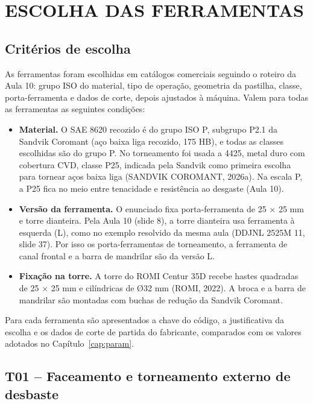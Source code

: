\chapter{ESCOLHA DAS FERRAMENTAS}

\section{Critérios de escolha}

As ferramentas foram escolhidas em catálogos comerciais seguindo o roteiro da Aula 10: grupo ISO do material, tipo de operação, geometria da pastilha, classe, porta-ferramenta e dados de corte, depois ajustados à máquina. Valem para todas as ferramentas as seguintes condições:

\begin{itemize}
\item \textbf{Material.} O SAE 8620 recozido é do grupo ISO P, subgrupo P2.1 da Sandvik Coromant (aço baixa liga recozido, 175 HB), e todas as classes escolhidas são do grupo P. No torneamento foi usada a 4425, metal duro com cobertura CVD, classe P25, indicada pela Sandvik como primeira escolha para tornear aços baixa liga (SANDVIK COROMANT, 2026a). Na escala P, a P25 fica no meio entre tenacidade e resistência ao desgaste (Aula 10).
\item \textbf{Versão da ferramenta.} O enunciado fixa porta-ferramenta de 25 $\times$ 25 mm e torre dianteira. Pela Aula 10 (slide 8), a torre dianteira usa ferramenta à esquerda (L), como no exemplo resolvido da mesma aula (DDJNL 2525M 11, slide 37). Por isso os porta-ferramentas de torneamento, a ferramenta de canal frontal e a barra de mandrilar são da versão L.
\item \textbf{Fixação na torre.} A torre do ROMI Centur 35D recebe hastes quadradas de 25 $\times$ 25 mm e cilíndricas de Ø32 mm (ROMI, 2022). A broca e a barra de mandrilar são montadas com buchas de redução da Sandvik Coromant.
\end{itemize}

Para cada ferramenta são apresentados a chave do código, a justificativa da escolha e os dados de corte de partida do fabricante, comparados com os valores adotados no Capítulo~\ref{cap:param}.

\section{T01 – Faceamento e torneamento externo de desbaste}

